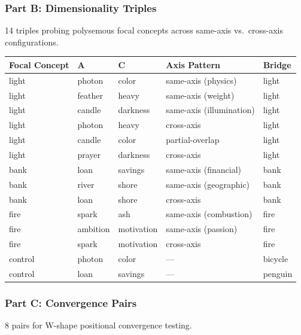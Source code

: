 \subsubsection{Part B: Dimensionality Triples}\label{part-b-dimensionality-triples}

14 triples probing polysemous focal concepts across same-axis vs.~cross-axis configurations.

\begin{longtable}[]{@{}lllll@{}}
\toprule\noalign{}
Focal Concept & A & C & Axis Pattern & Bridge \\
\midrule\noalign{}
\endhead
\bottomrule\noalign{}
\endlastfoot
light & photon & color & same-axis (physics) & light \\
light & feather & heavy & same-axis (weight) & light \\
light & candle & darkness & same-axis (illumination) & light \\
light & photon & heavy & cross-axis & light \\
light & candle & color & partial-overlap & light \\
light & prayer & darkness & cross-axis & light \\
bank & loan & savings & same-axis (financial) & bank \\
bank & river & shore & same-axis (geographic) & bank \\
bank & loan & shore & cross-axis & bank \\
fire & spark & ash & same-axis (combustion) & fire \\
fire & ambition & motivation & same-axis (passion) & fire \\
fire & spark & motivation & cross-axis & fire \\
control & photon & color & --- & bicycle \\
control & loan & savings & --- & penguin \\
\end{longtable}

\subsubsection{Part C: Convergence Pairs}\label{part-c-convergence-pairs}

8 pairs for W-shape positional convergence testing.

